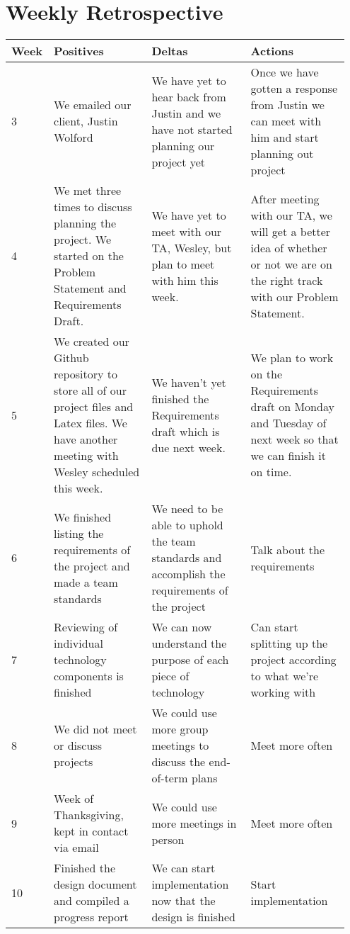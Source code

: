 \documentclass[compsoc, draftclsnofoot, onecolumn, letterpaper, 10pt]{IEEEtran}
\begin{document}
\newpage
\section{Weekly Retrospective}
\begin{table}[ht]
\centering

\begin{tabular}{ | p{0.05\linewidth} | p{0.3\linewidth} | p{0.3\linewidth} | p{0.3\linewidth}|}
    \hline
    \textbf{Week} & \textbf{Positives} & \textbf{Deltas} & \textbf{Actions}\\ \hline
    3 & We emailed our client, Justin Wolford & We have yet to hear back from Justin and we have not started planning our project yet & Once we have gotten a response from Justin we can meet with him and start planning out project\\ \hline
    4 & We met three times to discuss planning the project. We started on the Problem Statement and Requirements Draft. & We have yet to meet with our TA, Wesley, but plan to meet with him this week. & After meeting with our TA, we will get a better idea of whether or not we are on the right track with our Problem Statement.\\ \hline
    5 & We created our Github repository to store all of our project files and Latex files. We have another meeting with Wesley scheduled this week. & We haven't yet finished the Requirements draft which is due next week. & We plan to work on the Requirements draft on Monday and Tuesday of next week so that we can finish it on time.\\ \hline
    6 & We finished listing the requirements of the project and made a team standards & We need to be able to uphold the team standards and accomplish the requirements of the project & Talk about the requirements\\ \hline
    7 & Reviewing of individual technology components is finished & We can now understand the purpose of each piece of technology & Can start splitting up the project according to what we're working with\\ \hline
    8 & We did not meet or discuss projects & We could use more group meetings to discuss the end-of-term plans & Meet more often\\ \hline
    9 & Week of Thanksgiving, kept in contact via email & We could use more meetings in person & Meet more often\\ \hline
    10 & Finished the design document and compiled a progress report & We can start implementation now that the design is finished & Start implementation\\ \hline 
\end{tabular} 
\end{table}
\end{document}
